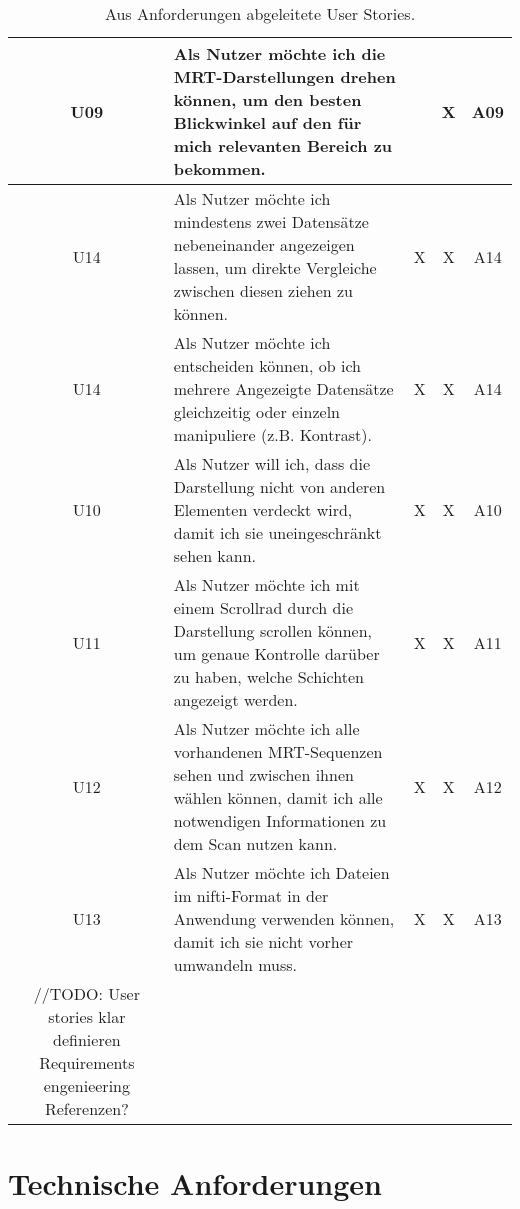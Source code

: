 \begin{table}
\begin{tabular}{|c|p{10cm}|c|c|c|}
\hline
U09 & Als Nutzer möchte ich die MRT-Darstellungen drehen können, um den besten Blickwinkel auf den für mich relevanten Bereich zu bekommen. & & X & A09\\
\hline
U14 & Als Nutzer möchte ich mindestens zwei Datensätze nebeneinander angezeigen lassen, um direkte Vergleiche zwischen diesen ziehen zu können. & X & X & A14\\
\hline
U14 & Als Nutzer möchte ich entscheiden können, ob ich mehrere Angezeigte Datensätze gleichzeitig oder einzeln manipuliere (z.B. Kontrast). & X & X & A14\\
\hline
U10 & Als Nutzer will ich, dass die Darstellung nicht von anderen Elementen verdeckt wird, damit ich sie uneingeschränkt sehen kann. & X & X & A10\\
\hline
U11 & Als Nutzer möchte ich mit einem Scrollrad durch die Darstellung scrollen können, um genaue Kontrolle darüber zu haben, welche Schichten angezeigt werden. & X & X & A11\\
\hline
U12 & Als Nutzer möchte ich alle vorhandenen MRT-Sequenzen sehen und zwischen ihnen wählen können, damit ich alle notwendigen Informationen zu dem Scan nutzen kann. & X & X & A12\\
\hline
U13 & Als Nutzer möchte ich Dateien im nifti-Format in der Anwendung verwenden können, damit ich sie nicht vorher umwandeln muss. & X & X & A13\\
\hline

//TODO:
User stories klar definieren
Requirements engenieering 
Referenzen?

\end{tabular}
\caption{\label{tab:table-name}Aus Anforderungen abgeleitete User Stories.}
\end{table}

\section{Technische Anforderungen}
